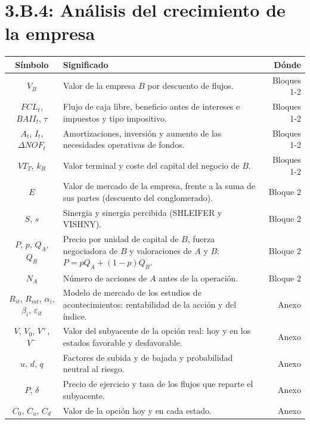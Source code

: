 \documentclass[10pt,a4paper]{article}
\newcommand{\cabecera}{\toprule\textbf{Símbolo} & \textbf{Significado} & \textbf{Dónde}\\\midrule\endhead\bottomrule\endfoot}
\begin{document}
\section{3.B.4: Análisis del crecimiento de la empresa}
\begin{longtable}{SMD}
\cabecera
$V_B$ & Valor de la empresa $B$ por descuento de flujos. & Bloques 1-2\\
$FCL_t$, $BAII_t$, $\tau$ & Flujo de caja libre, beneficio antes de intereses e impuestos y tipo impositivo. & Bloques 1-2\\
$A_t$, $I_t$, $\Delta NOF_t$ & Amortizaciones, inversión y aumento de las necesidades operativas de fondos. & Bloques 1-2\\
$VT_T$, $k_B$ & Valor terminal y coste del capital del negocio de $B$. & Bloques 1-2\\
$E$ & Valor de mercado de la empresa, frente a la suma de sus partes (descuento del conglomerado). & Bloque 2\\
$S$, $s$ & Sinergia y sinergia percibida (SHLEIFER y VISHNY). & Bloque 2\\
$P$, $p$, $Q_A$, $Q_B$ & Precio por unidad de capital de $B$, fuerza negociadora de $B$ y valoraciones de $A$ y $B$: $P=pQ_A+(1-p)Q_B$. & Bloque 2\\
$N_A$ & Número de acciones de $A$ antes de la operación. & Bloque 2\\
$R_{it}$, $R_{mt}$, $\alpha_i$, $\beta_i$, $\varepsilon_{it}$ & Modelo de mercado de los estudios de acontecimientos: rentabilidad de la acción y del índice. & Anexo\\
$V$, $V_0$, $V^+$, $V^-$ & Valor del subyacente de la opción real: hoy y en los estados favorable y desfavorable. & Anexo\\
$u$, $d$, $q$ & Factores de subida y de bajada y probabilidad neutral al riesgo. & Anexo\\
$P$, $\delta$ & Precio de ejercicio y tasa de los flujos que reparte el subyacente. & Anexo\\
$C_0$, $C_u$, $C_d$ & Valor de la opción hoy y en cada estado. & Anexo\\
\end{longtable}
\end{document}
